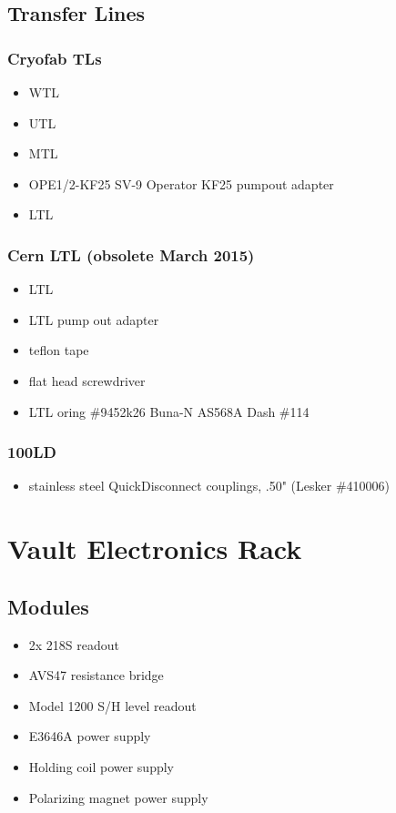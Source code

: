   \subsection{Transfer Lines}
\subsubsection{Cryofab TLs}
\begin{itemize}
\item WTL
\item UTL
\item MTL
\item {} OPE1/2-KF25 SV-9 Operator KF25 pumpout adapter
\item LTL
\end{itemize}

\subsubsection{Cern LTL (obsolete March 2015)}
\begin{itemize}
\item LTL
\item LTL pump out adapter
\item teflon tape
\item flat head screwdriver
\item LTL oring  \#9452k26 Buna-N AS568A Dash \#114
\end{itemize}

\subsubsection{100LD}
\begin{itemize}
\item stainless steel QuickDisconnect couplings, .50" (Lesker \#410006)
\end{itemize}


\section{Vault Electronics Rack}
\subsection{Modules}
\begin{itemize}
 \item 2x  218S readout
\item AVS47 resistance bridge
\item {} Model 1200 S/H level readout
\item {} E3646A power supply
\item Holding coil power supply
\item Polarizing magnet power supply
\end{itemize}
